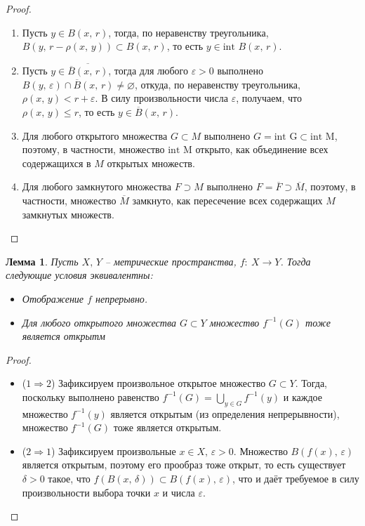 \documentclass[a4paper,12pt]{article}
\renewcommand{\leq}{\ensuremath{\leqslant}}
\renewcommand{\emptyset}{\ensuremath{\varnothing}}
\theoremstyle{plain}
\newtheorem{lemma}{Лемма}[section]
\theoremstyle{definition}
\theoremstyle{remark}
\begin{document}
\begin{proof}
	\begin{enumerate}
		\item Пусть $y \in B(x,\,r)$, тогда, по неравенству треугольника, $B(y,\, r - \rho(x,\,y)) \subset B(x,\,r)$, то есть $y \in \text{int }B(x,\,r)$.
		\item Пусть $y \in \overline{\overline{B}(x,\,r)}$, тогда для любого $\varepsilon > 0$ выполнено $B(y,\,\varepsilon) \cap \overline{B}(x,\,r) \neq \emptyset$, откуда, по неравенству треугольника, $\rho(x,\,y) < r + \varepsilon$. В силу произвольности числа $\varepsilon$, получаем, что $\rho(x,\,y) \leq r$, то есть $y \in \overline{B}(x,\,r)$.
		\item Для любого открытого множества $G \subset M$ выполнено $G = \text{int G} \subset \text{int M}$, поэтому, в частности, множество $\text{int M}$ открыто, как объединение всех содержащихся в $M$ открытых множеств.
		\item Для любого замкнутого множества $F \supset M$ выполнено $F = \overline{F} \supset \overline{M}$, поэтому, в частности, множество $\overline{M}$ замкнуто, как пересечение всех содержащих $M$ замкнутых множеств.
	\end{enumerate}
\end{proof}

\begin{lemma}
	Пусть $X,\, Y$ -- метрические пространства, $f :\: X \to Y$. Тогда следующие условия эквивалентны:
	\begin{itemize}
		\item Отображение $f$ непрерывно.
		\item Для любого открытого множества $G \subset Y$ множество $f^{-1}(G)$ тоже является открытм
	\end{itemize}
\end{lemma}

\begin{proof}
	\begin{itemize}
		\item ($1 \Rightarrow 2$) Зафиксируем произвольное открытое множество $G \subset Y$. Тогда, поскольку выполнено равенство $f^{-1}(G) = \bigcup_{y \in G}f^{-1}(y)$ и каждое множество $f^{-1}(y)$ является открытым (из определения непрерывности), множество $f^{-1}(G)$ тоже является открытым.
		\item ($2 \Rightarrow 1$) Зафиксируем произвольные $x \in X,\, \varepsilon >0$. Множество $B(f(x),\, \varepsilon)$ является открытым, поэтому его прообраз тоже открыт, то есть существует $\delta >0$ такое, что $f(B(x,\, \delta)) \subset B(f(x),\, \varepsilon)$, что и даёт требуемое в силу произвольности выбора точки $x$ и числа $\varepsilon$.
	\end{itemize}
\end{proof}
\end{document}
